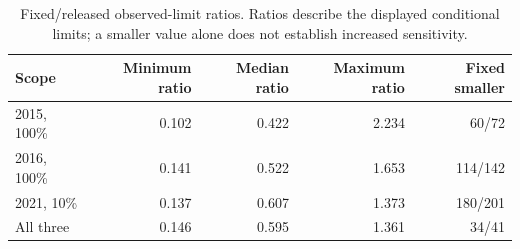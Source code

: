 \begin{table}[H]\centering\small
\begin{tabular}{lrrrr}\toprule
Scope & Minimum ratio & Median ratio & Maximum ratio & Fixed smaller\\\midrule
2015, 100\% & 0.102 & 0.422 & 2.234 & 60/72\\
2016, 100\% & 0.141 & 0.522 & 1.653 & 114/142\\
2021, 10\% & 0.137 & 0.607 & 1.373 & 180/201\\
All three & 0.146 & 0.595 & 1.361 & 34/41\\
\bottomrule\end{tabular}
\caption{Fixed/released observed-limit ratios. Ratios describe the displayed conditional limits; a smaller value alone does not establish increased sensitivity.}
\label{tab:observed}\end{table}
